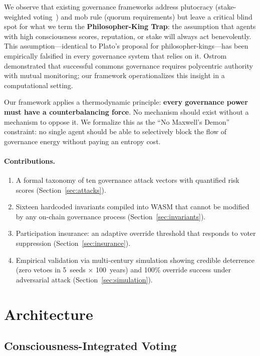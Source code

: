 \documentclass[11pt,a4paper]{article}
\begin{document}
We observe that existing governance frameworks address plutocracy (stake-weighted voting~\cite{buterin2021}) and mob rule (quorum requirements) but leave a critical blind spot for what we term the \textbf{Philosopher-King Trap}: the assumption that agents with high consciousness scores, reputation, or stake will always act benevolently. This assumption---identical to Plato's proposal for philosopher-kings---has been empirically falsified in every governance system that relies on it. Ostrom~\cite{ostrom} demonstrated that successful commons governance requires polycentric authority with mutual monitoring; our framework operationalizes this insight in a computational setting.

Our framework applies a thermodynamic principle: \textbf{every governance power must have a counterbalancing force}. No mechanism should exist without a mechanism to oppose it. We formalize this as the ``No Maxwell's Demon'' constraint: no single agent should be able to selectively block the flow of governance energy without paying an entropy cost.

\paragraph{Contributions.}
\begin{enumerate}
    \item A formal taxonomy of ten governance attack vectors with quantified risk scores (Section~\ref{sec:attacks}).
    \item Sixteen hardcoded invariants compiled into WASM that cannot be modified by any on-chain governance process (Section~\ref{sec:invariants}).
    \item Participation insurance: an adaptive override threshold that responds to voter suppression (Section~\ref{sec:insurance}).
    \item Empirical validation via multi-century simulation showing credible deterrence (zero vetoes in 5~seeds $\times$ 100~years) and 100\% override success under adversarial attack (Section~\ref{sec:simulation}).
\end{enumerate}

\section{Architecture}
\label{sec:architecture}

\subsection{Consciousness-Integrated Voting}
\end{document}
